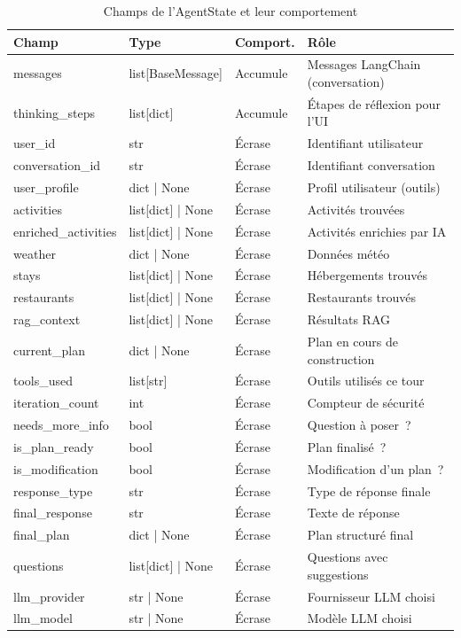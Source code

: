 \begin{table}[H]
    \centering
    \caption{Champs de l'AgentState et leur comportement}
    \label{tab:agent_state}
    \footnotesize
    \begin{tabular}{p{3.5cm} p{3cm} p{2cm} p{5cm}}
        \toprule
        \textbf{Champ} & \textbf{Type} & \textbf{Comport.} & \textbf{Rôle} \\
        \midrule
        messages & list[BaseMessage] & Accumule & Messages LangChain (conversation) \\
        thinking\_steps & list[dict] & Accumule & Étapes de réflexion pour l'UI \\
        user\_id & str & Écrase & Identifiant utilisateur \\
        conversation\_id & str & Écrase & Identifiant conversation \\
        user\_profile & dict | None & Écrase & Profil utilisateur (outils) \\
        activities & list[dict] | None & Écrase & Activités trouvées \\
        enriched\_activities & list[dict] | None & Écrase & Activités enrichies par IA \\
        weather & dict | None & Écrase & Données météo \\
        stays & list[dict] | None & Écrase & Hébergements trouvés \\
        restaurants & list[dict] | None & Écrase & Restaurants trouvés \\
        rag\_context & list[dict] | None & Écrase & Résultats RAG \\
        current\_plan & dict | None & Écrase & Plan en cours de construction \\
        tools\_used & list[str] & Écrase & Outils utilisés ce tour \\
        iteration\_count & int & Écrase & Compteur de sécurité \\
        needs\_more\_info & bool & Écrase & Question à poser~? \\
        is\_plan\_ready & bool & Écrase & Plan finalisé~? \\
        is\_modification & bool & Écrase & Modification d'un plan~? \\
        response\_type & str & Écrase & Type de réponse finale \\
        final\_response & str & Écrase & Texte de réponse \\
        final\_plan & dict | None & Écrase & Plan structuré final \\
        questions & list[dict] | None & Écrase & Questions avec suggestions \\
        llm\_provider & str | None & Écrase & Fournisseur LLM choisi \\
        llm\_model & str | None & Écrase & Modèle LLM choisi \\
        \bottomrule
    \end{tabular}
\end{table}


